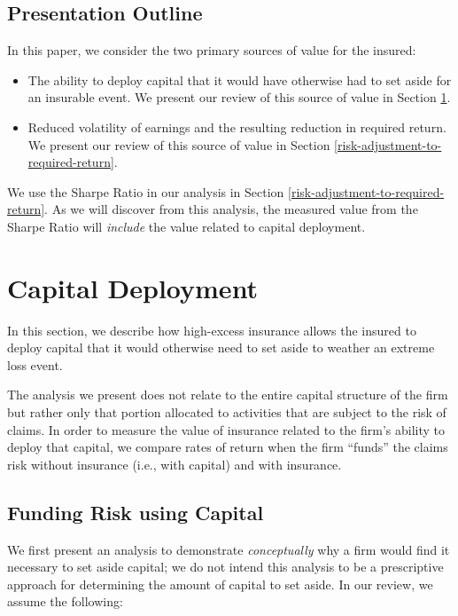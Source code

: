 \documentclass[
]{article}
\begin{document}
\hypertarget{presentation-outline}{%
\subsection{Presentation Outline}\label{presentation-outline}}

In this paper, we consider the two primary sources of value for the
insured:

\begin{itemize}
\item
  The ability to deploy capital that it would have otherwise had to set
  aside for an insurable event. We present our review of this source of
  value in Section \ref{capital-deployment}.
\item
  Reduced volatility of earnings and the resulting reduction in required
  return. We present our review of this source of value in Section
  \ref{risk-adjustment-to-required-return}.
\end{itemize}

We use the Sharpe Ratio in our analysis in Section
\ref{risk-adjustment-to-required-return}. As we will discover from this
analysis, the measured value from the Sharpe Ratio will \emph{include}
the value related to capital deployment.

\hypertarget{capital-deployment}{%
\section{Capital Deployment}\label{capital-deployment}}

In this section, we describe how high-excess insurance allows the
insured to deploy capital that it would otherwise need to set aside to
weather an extreme loss event.

The analysis we present does not relate to the entire capital structure
of the firm but rather only that portion allocated to activities that
are subject to the risk of claims. In order to measure the value of
insurance related to the firm's ability to deploy that capital, we
compare rates of return when the firm ``funds'' the claims risk without
insurance (i.e., with capital) and with insurance.

\hypertarget{funding-risk-using-capital}{%
\subsection{Funding Risk using
Capital}\label{funding-risk-using-capital}}

We first present an analysis to demonstrate \emph{conceptually} why a
firm would find it necessary to set aside capital; we do not intend this
analysis to be a prescriptive approach for determining the amount of
capital to set aside. In our review, we assume the following:
\end{document}
